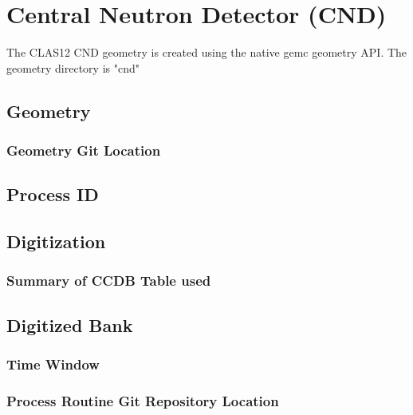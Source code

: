 \section{Central Neutron Detector (CND)}


The CLAS12 CND geometry is created using the native gemc geometry API.
The geometry directory is "cnd"

\subsection{Geometry}

\subsubsection{Geometry Git Location}

\subsection{Process ID}

\subsection{Digitization}

\subsubsection{Summary of CCDB Table used}

\subsection{Digitized Bank}

\subsubsection{Time Window}

\subsubsection{Process Routine Git Repository Location}


